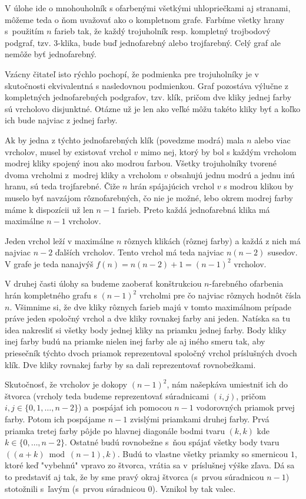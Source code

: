 {%
V úlohe ide o mnohouholník s ofarbenými všetkými uhlopriečkami aj stranami,
môžeme teda o ňom uvažovať ako o kompletnom grafe.
Farbíme všetky hrany s~použitím $n$ farieb tak,
že každý trojuholník resp. kompletný trojbodový podgraf, tzv. 3-klika, bude buď jednofarebný alebo trojfarebný.
Celý graf ale nemôže byť jednofarebný.

Vzácny čitateľ isto rýchlo pochopí, že podmienka pre trojuholníky
je v skutočnosti ekvivalentná s nasledovnou podmienkou. Graf pozostáva výlučne
z kompletných jednofarebných podgrafov, tzv. klík,
pričom dve kliky jednej farby sú vrcholovo disjunktné.
Otázne už je len ako veľké môžu takéto kliky byť a koľko ich bude najviac z jednej farby.

Ak by jedna z týchto jednofarebných klík (povedzme modrá) mala $n$ alebo viac vrcholov,
musel by existovať vrchol $v$ mimo nej, ktorý by bol s každým vrcholom modrej kliky
spojený inou ako modrou farbou. Všetky trojuholníky tvorené dvoma vrcholmi
z~modrej kliky a vrcholom $v$ obsahujú jednu modrú a jednu inú hranu, sú teda trojfarebné.
Čiže $n$ hrán spájajúcich vrchol $v$ s modrou klikou by muselo byť navzájom rôznofarebných, čo nie je možné,
lebo okrem modrej farby máme k dispozícii už len $n-1$ farieb.
Preto každá jednofarebná klika má maximálne $n-1$ vrcholov.

Jeden vrchol leží v maximálne $n$ rôznych klikách (rôznej farby) a každá z nich má najviac $n-2$ ďalších vrcholov.
Tento vrchol má teda najviac $n(n-2)$ susedov. V grafe je teda nanajvýš $f(n)=n(n-2)+1=(n-1)^2$ vrcholov.

\smallskip
V druhej časti úlohy sa budeme zaoberať konštrukciou $n$-farebného ofarbenia hrán
kompletného grafu s $(n-1)^2$ vrcholmi pre čo najviac rôznych hodnôt čísla $n$.
Všimnime si, že dve kliky rôznych farieb majú v tomto maximálnom prípade práve jeden spoločný vrchol a dve kliky
rovnakej farby ani jeden. Natíska sa tu idea nakresliť si všetky body jednej kliky na priamku jednej farby.
Body kliky inej farby budú na priamke nielen inej farby ale aj iného smeru
tak, aby priesečník týchto dvoch priamok reprezentoval spoločný vrchol príslušných dvoch klík.
Dve kliky rovnakej farby by sa dali reprezentovať rovnobežkami.

Skutočnosť, že vrcholov je dokopy $(n-1)^2$, nám našepkáva umiestniť ich do štvorca (vrcholy teda budeme reprezentovať súradnicami $(i,j)$, pričom $i,j\in\{0,1,\dots,n-2\}$) a~pospájať ich pomocou $n-1$ vodorovných priamok prvej farby.
Potom ich pospájame $n-1$ zvislými priamkami druhej farby.
Prvá priamka tretej farby pôjde po hlavnej diagonále bodmi tvaru $(k,k)$ kde $k\in\{0,\dots,n-2\}$.
Ostatné budú rovnobežne s~ňou spájať všetky body tvaru $((a+k) \bmod (n-1),k)$.
Budú to vlastne všetky priamky so smernicou $1$, ktoré keď "vybehnú" vpravo zo štvorca,
vrátia sa v~príslušnej výške zľava. Dá sa to predstaviť aj tak, že by sme pravý okraj štvorca (s~prvou súradnicou $n-1$) stotožnili s~ľavým (s~prvou súradnicou $0$). Vznikol by tak valec.

}
